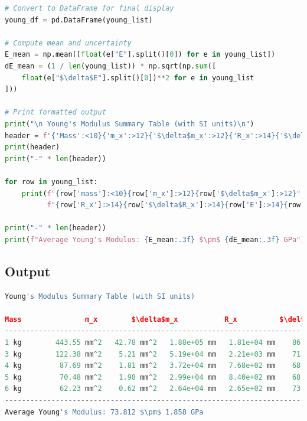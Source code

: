 \documentclass[a4paper,11pt]{article}
\begin{document}
\begin{lstlisting}[language=Python]
# Convert to DataFrame for final display
young_df = pd.DataFrame(young_list)

# Compute mean and uncertainty
E_mean = np.mean([float(e["E"].split()[0]) for e in young_list])
dE_mean = (1 / len(young_list)) * np.sqrt(np.sum([
    float(e["$\delta$E"].split()[0])**2 for e in young_list
]))

# Print formatted output
print("\n Young's Modulus Summary Table (with SI units)\n")
header = f"{'Mass':<10}{'m_x':>12}{'$\delta$m_x':>12}{'R_x':>14}{'$\delta$R_x':>14}{'E':>14}{'$\delta$E':>14}"
print(header)
print("-" * len(header))

for row in young_list:
    print(f"{row['mass']:<10}{row['m_x']:>12}{row['$\delta$m_x']:>12}"
          f"{row['R_x']:>14}{row['$\delta$R_x']:>14}{row['E']:>14}{row['$\delta$E']:>14}")

print("-" * len(header))
print(f"Average Young's Modulus: {E_mean:.3f} $\pm$ {dE_mean:.3f} GPa")


\end{lstlisting}
\label{Code: 5}

\begin{landscape}
  \pagestyle{empty}  %
\subsection{Output}
\begin{lstlisting}[language=Python]
Young's Modulus Summary Table (with SI units)

Mass               m_x        $\delta$m_x           R_x          $\delta$R_x             E            $\delta$E
------------------------------------------------------------------------------------------
1 kg        443.55 mm^2   42.78 mm^2   1.88e+05 mm   1.81e+04 mm    86.741 GPa     8.377 GPa
3 kg        122.38 mm^2    5.21 mm^2   5.19e+04 mm   2.21e+03 mm    71.797 GPa     3.081 GPa
4 kg         87.69 mm^2    1.81 mm^2   3.72e+04 mm   7.68e+02 mm    68.593 GPa     1.459 GPa
5 kg         70.48 mm^2    1.98 mm^2   2.99e+04 mm   8.40e+02 mm    68.912 GPa     1.968 GPa
6 kg         62.23 mm^2    0.62 mm^2   2.64e+04 mm   2.65e+02 mm    73.019 GPa     0.825 GPa
------------------------------------------------------------------------------------------
Average Young's Modulus: 73.812 $\pm$ 1.858 GPa
\end{lstlisting}
\label{output: 3}
\end{landscape}
\end{document}

